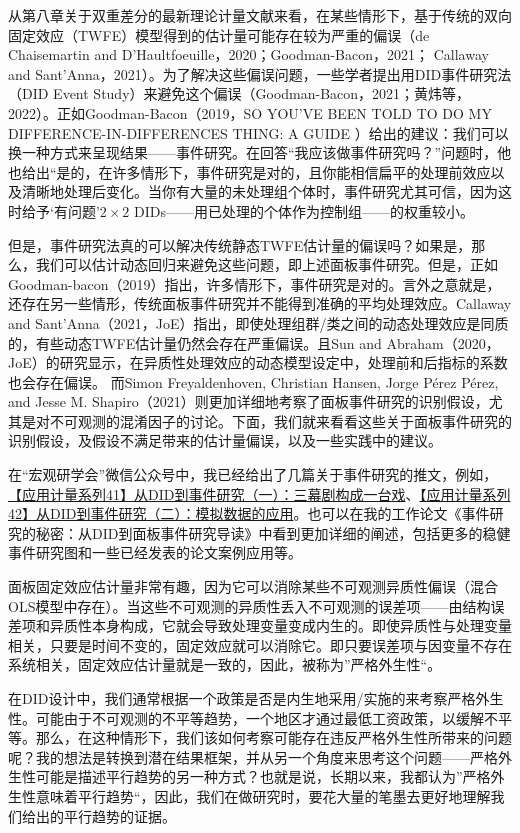 \documentclass[cn,12pt,math=newtx,citestyle=gb7714-2015,bibstyle=gb7714-2015]{elegantbook}
\begin{document}
	    从第八章关于双重差分的最新理论计量文献来看，在某些情形下，基于传统的双向固定效应（TWFE）模型得到的估计量可能存在较为严重的偏误（de Chaisemartin and D’Haultfoeuille，2020；Goodman-Bacon，2021； Callaway and Sant’Anna，2021）。为了解决这些偏误问题，一些学者提出用DID事件研究法（DID Event Study）来避免这个偏误（Goodman-Bacon，2021；黄炜等，2022）。正如Goodman-Bacon（2019，SO YOU’VE BEEN TOLD TO DO MY DIFFERENCE-IN-DIFFERENCES THING: A GUIDE ）给出的建议：我们可以换一种方式来呈现结果——事件研究。在回答“我应该做事件研究吗？”问题时，他也给出“是的，在许多情形下，事件研究是对的，且你能相信扁平的处理前效应以及清晰地处理后变化。当你有大量的未处理组个体时，事件研究尤其可信，因为这时给予‘有问题’$2 \times 2$ DIDs——用已处理的个体作为控制组——的权重较小。
	    
	    但是，事件研究法真的可以解决传统静态TWFE估计量的偏误吗？如果是，那么，我们可以估计动态回归来避免这些问题，即上述面板事件研究。但是，正如Goodman-bacon（2019）指出，许多情形下，事件研究是对的。言外之意就是，还存在另一些情形，传统面板事件研究并不能得到准确的平均处理效应。Callaway and Sant’Anna（2021，JoE）指出，即使处理组群/类之间的动态处理效应是同质的，有些动态TWFE估计量仍然会存在严重偏误。且Sun and Abraham（2020，JoE）的研究显示，在异质性处理效应的动态模型设定中，处理前和后指标的系数也会存在偏误。
而Simon Freyaldenhoven, Christian Hansen, Jorge Pérez Pérez, and Jesse M. Shapiro（2021）则更加详细地考察了面板事件研究的识别假设，尤其是对不可观测的混淆因子的讨论。下面，我们就来看看这些关于面板事件研究的识别假设，及假设不满足带来的估计量偏误，以及一些实践中的建议。
	    
	    在“宏观研学会”微信公众号中，我已经给出了几篇关于事件研究的推文，例如，\href{https://mp.weixin.qq.com/s/Vlag2pudOub-IuMEk_snKA}{【应用计量系列41】从DID到事件研究（一）：三幕剧构成一台戏}、\href{https://mp.weixin.qq.com/s/NBgrdJuPSI7Q9Tqq1bAo0g}{【应用计量系列42】从DID到事件研究（二）：模拟数据的应用}。也可以在我的工作论文《事件研究的秘密：从DID到面板事件研究导读》中看到更加详细的阐述，包括更多的稳健事件研究图和一些已经发表的论文案例应用等。
	    
	    面板固定效应估计量非常有趣，因为它可以消除某些不可观测异质性偏误（混合OLS模型中存在）。当这些不可观测的异质性丢入不可观测的误差项——由结构误差项和异质性本身构成，它就会导致处理变量变成内生的。即使异质性与处理变量相关，只要是时间不变的，固定效应就可以消除它。即只要误差项与因变量不存在系统相关，固定效应估计量就是一致的，因此，被称为”严格外生性“。
	    
	    在DID设计中，我们通常根据一个政策是否是内生地采用/实施的来考察严格外生性。可能由于不可观测的不平等趋势，一个地区才通过最低工资政策，以缓解不平等。那么，在这种情形下，我们该如何考察可能存在违反严格外生性所带来的问题呢？我的想法是转换到潜在结果框架，并从另一个角度来思考这个问题——严格外生性可能是描述平行趋势的另一种方式？也就是说，长期以来，我都认为”严格外生性意味着平行趋势“，因此，我们在做研究时，要花大量的笔墨去更好地理解我们给出的平行趋势的证据。
	    
\end{document}
